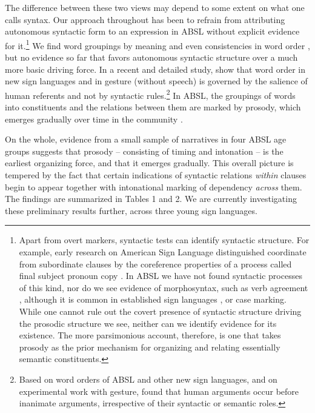 \documentclass[output=paper]{langsci/langscibook}
\begin{document}
    The difference between these two views may depend to some extent on what one calls syntax.  Our approach throughout has been to refrain from attributing autonomous syntactic form to an expression in ABSL without explicit evidence for it.\footnote{Apart from overt markers, syntactic tests can identify syntactic structure.  For example, early research on American Sign Language distinguished coordinate from subordinate clauses by the coreference properties of a process called final subject pronoun copy \citep{Padden1988}.  In ABSL we have not found syntactic processes of this kind, nor do we see evidence of morphosyntax, such as verb agreement \citep{Padden2010}, although it is common in established sign languages \citep{Aronoff2005}, or case marking.  While one cannot rule out the covert presence of syntactic structure driving the prosodic structure we see, neither can we identify evidence for its existence.  The more parsimonious account, therefore, is one that takes prosody as the prior mechanism for organizing and relating essentially semantic constituents.}  We find word groupings by meaning and even consistencies in word order \citep{Sandler2005}, but no evidence so far that favors autonomous syntactic structure over a much more basic driving force.  In a recent and detailed study, \citet{MeirSubmitted} show that word order in new sign languages and in gesture (without speech) is governed by the salience of human referents and not by syntactic rules.\footnote{Based on word orders of ABSL and other new sign languages, and on experimental work with gesture, \citet{MeirSubmitted} found that human arguments occur before inanimate arguments, irrespective of their syntactic or semantic roles.}  In ABSL, the groupings of words into constituents and the relations between them are marked by prosody, which emerges gradually over time in the community \citep{Sandler2011b}.

 On the whole, evidence from a small sample of narratives in four ABSL age groups suggests that prosody – consisting of timing and intonation -- is the earliest organizing force, and that it emerges gradually.  This overall picture is tempered by the fact that certain indications of syntactic relations \textit{within} clauses begin to appear together with intonational marking of dependency \textit{across} them. The findings are summarized in Tables 1 and 2. We are currently investigating these preliminary results further, across three young sign languages.
\end{document}
